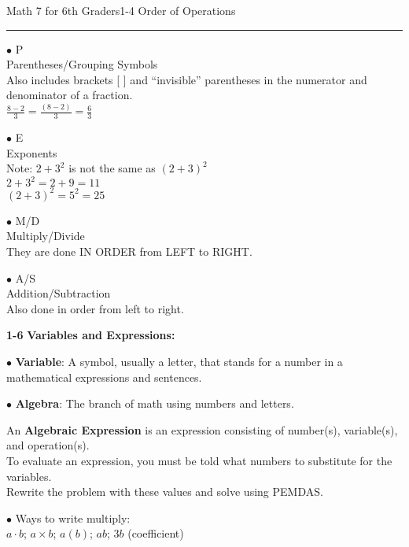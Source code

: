 \begin{enumerate*}
\newpage
\noindent\Large{Math 7 for 6th Graders\hfill 1-4 Order of Operations}
\noindent\hrule
\vspace{5mm}
			
			\begin{enumerate*}
			\item[$\bullet$]P\\
				Parentheses/Grouping Symbols\\
				Also includes brackets [ ] and ``invisible'' parentheses in the numerator and denominator of a fraction.\\
				$\frac{8-2}{3}=\frac{(8-2)}{3}=\frac{6}{3}$\\
			\item[$\bullet$]E\\
				Exponents\\
				Note: $2+3^2$ is not the same as $(2+3)^2$\\
				$2+3^2=2+9=11$\\
				$(2+3)^2=5^2=25$\\
			\item[$\bullet$]M/D\\
				Multiply/Divide\\
				They are done IN ORDER from LEFT to RIGHT.\\
			\item[$\bullet$]A/S\\
				Addition/Subtraction\\
				Also done in order from left to right.\\
			\end{enumerate*}
			
		\item[\Large\textbf{1-6}] \Large\textbf{Variables and Expressions:}\\
			\begin{enumerate*}
				\item[$\bullet$]\textbf{Variable}: A symbol, usually a letter, that stands for a number in a mathematical expressions and sentences.\\
				\item[$\bullet$]\textbf{Algebra}: The branch of math using numbers and letters.\\
				\item[]An \textbf{Algebraic Expression} is an expression consisting of number(s), variable(s), and operation(s).\\
					To evaluate an expression, you must be told what numbers to substitute for the variables.\\
					Rewrite the problem with these values and solve using PEMDAS.
				\item[$\bullet$]Ways to write multiply:\\
					$a\cdot b$; $a\times b$; $a(b)$; $ab$; $3b$ (coefficient)\\
					

\end{enumerate*}
\end{enumerate*}
